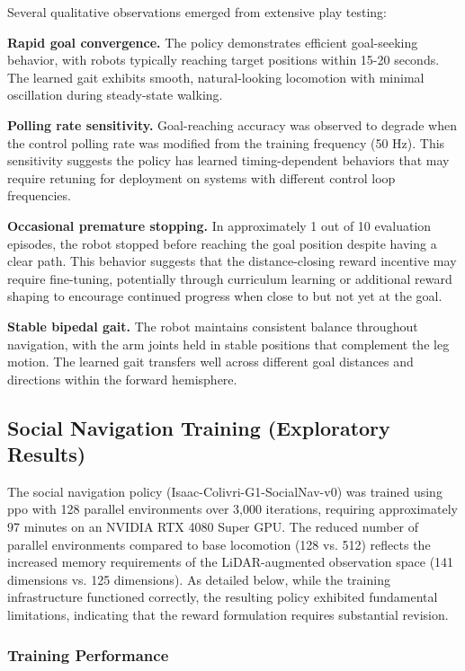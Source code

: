 \documentclass[12pt,a4paper]{article}
\begin{document}
Several qualitative observations emerged from extensive play testing:

\textbf{Rapid goal convergence.} The policy demonstrates efficient goal-seeking behavior, with robots typically reaching target positions within 15-20 seconds. The learned gait exhibits smooth, natural-looking locomotion with minimal oscillation during steady-state walking.

\textbf{Polling rate sensitivity.} Goal-reaching accuracy was observed to degrade when the control polling rate was modified from the training frequency (50 Hz). This sensitivity suggests the policy has learned timing-dependent behaviors that may require retuning for deployment on systems with different control loop frequencies.

\textbf{Occasional premature stopping.} In approximately 1 out of 10 evaluation episodes, the robot stopped before reaching the goal position despite having a clear path. This behavior suggests that the distance-closing reward incentive may require fine-tuning, potentially through curriculum learning or additional reward shaping to encourage continued progress when close to but not yet at the goal.

\textbf{Stable bipedal gait.} The robot maintains consistent balance throughout navigation, with the arm joints held in stable positions that complement the leg motion. The learned gait transfers well across different goal distances and directions within the forward hemisphere.

\subsection{Social Navigation Training (Exploratory Results)}

The social navigation policy (Isaac-Colivri-G1-SocialNav-v0) was trained using \ac{ppo} with 128 parallel environments over 3,000 iterations, requiring approximately 97 minutes on an NVIDIA RTX 4080 Super GPU. The reduced number of parallel environments compared to base locomotion (128 vs. 512) reflects the increased memory requirements of the LiDAR-augmented observation space (141 dimensions vs. 125 dimensions). As detailed below, while the training infrastructure functioned correctly, the resulting policy exhibited fundamental limitations, indicating that the reward formulation requires substantial revision.

\subsubsection{Training Performance}
\end{document}
